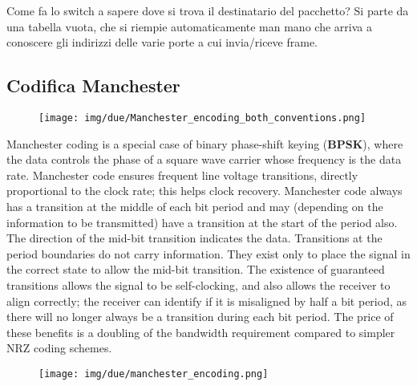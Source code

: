 \documentclass{article}
\begin{document}
\noindent Come fa lo switch a sapere dove si trova il destinatario del pacchetto? Si parte da una tabella vuota, che si riempie automaticamente man
mano che arriva a conoscere gli indirizzi delle varie porte a cui invia/riceve frame.

\subsection{Codifica Manchester}
\begin{figure}[!ht]
    \begin{center}
        \texttt{[image: img/due/Manchester\_encoding\_both\_conventions.png]}         
    \end{center}
\end{figure}

\noindent Manchester coding is a special case of binary phase-shift keying (\textbf{BPSK}), where the data controls the phase of a
 square wave carrier whose frequency is the data rate. Manchester code ensures frequent line voltage transitions, directly proportional
 to the clock rate; this helps clock recovery. 
 Manchester code always has a transition at the middle of each bit period and may (depending on the information to be transmitted) have 
 a transition at the start of the period also. The direction of the mid-bit transition indicates the data. Transitions at the period 
 boundaries do not carry information. They exist only to place the signal in the correct state to allow the mid-bit transition. 
 The existence of guaranteed transitions allows the signal to be self-clocking, and also allows the receiver to align correctly; the
 receiver can identify if it is misaligned by half a bit period, as there will no longer always be a transition during each bit period.
 The price of these benefits is a doubling of the bandwidth requirement compared to simpler NRZ coding schemes. 


 \begin{figure}[!ht]
    \begin{center}
        \texttt{[image: img/due/manchester\_encoding.png]}         
    \end{center}
\end{figure}
\end{document}
